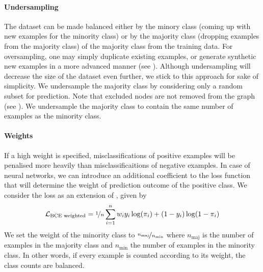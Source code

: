 \documentclass[
	fontsize=10pt, %
	twoside=false, %
	secnumdepth=1, %
  toc=indentunnumbered %
]{kaobook}
\begin{document}
\paragraph{Undersampling}
The dataset can be made balanced 
either by  the minory class (coming up with new examples for
the minority class) or by  the majority class (dropping
examples from the majority class) of the majority class from the training data.
For oversampling, one may simply duplicate existing examples, or generate
synthetic new examples in a more advanced manner (see
). Although undersampling will decrease the size of the
dataset even further, we stick to this approach for sake of simplicity.
%
We undersample the majority class by considering only a random subset for
prediction. Note that excluded nodes are not removed from the graph (see
). We undersample the majority class to contain
the same number of examples as the minority class.




\paragraph{Weights} 
If a high weight is specified, misclassifications of positive
examples will be penalised more heavily than misclassificaitions of negative examples.
In case of neural networks, we can introduce an additional coefficient to the
loss function that will determine the weight of prediction outcome of the
positive class. 
%
We consider the  loss as
an extension of , given by
\begin{align}
  \label{eq:bce-loss-weighted}
  \mathcal{L}_{\text{BCE weighted}} = \nicefrac{1}{n} \sum_{i=1}^n w_i y_i \log(\pi_i) + (1-y_i) \log (1-\pi_i)
\end{align}
We set the weight of the minority class to
$\nicefrac{n_{\text{maj}}}{n_{\text{min}}}$ where $n_{\text{maj}}$ is the number
of examples in the majority
class and $n_{\text{min}}$ the number of examples in the minority class. In
other words, if every example is counted according to its weight, the class
counts are balanced.
\end{document}
